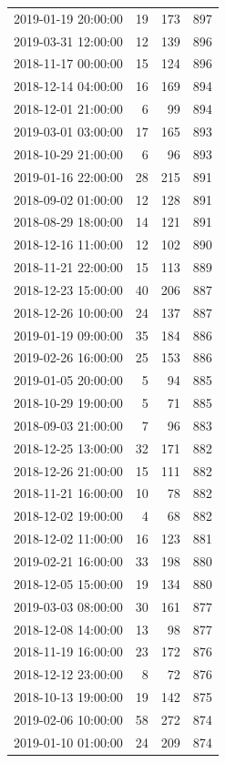 \begin{tabular}{lrrr}
2019-01-19 20:00:00 & 19 & 173 & 897 \\
2019-03-31 12:00:00 & 12 & 139 & 896 \\
2018-11-17 00:00:00 & 15 & 124 & 896 \\
2018-12-14 04:00:00 & 16 & 169 & 894 \\
2018-12-01 21:00:00 & 6 & 99 & 894 \\
2019-03-01 03:00:00 & 17 & 165 & 893 \\
2018-10-29 21:00:00 & 6 & 96 & 893 \\
2019-01-16 22:00:00 & 28 & 215 & 891 \\
2018-09-02 01:00:00 & 12 & 128 & 891 \\
2018-08-29 18:00:00 & 14 & 121 & 891 \\
2018-12-16 11:00:00 & 12 & 102 & 890 \\
2018-11-21 22:00:00 & 15 & 113 & 889 \\
2018-12-23 15:00:00 & 40 & 206 & 887 \\
2018-12-26 10:00:00 & 24 & 137 & 887 \\
2019-01-19 09:00:00 & 35 & 184 & 886 \\
2019-02-26 16:00:00 & 25 & 153 & 886 \\
2019-01-05 20:00:00 & 5 & 94 & 885 \\
2018-10-29 19:00:00 & 5 & 71 & 885 \\
2018-09-03 21:00:00 & 7 & 96 & 883 \\
2018-12-25 13:00:00 & 32 & 171 & 882 \\
2018-12-26 21:00:00 & 15 & 111 & 882 \\
2018-11-21 16:00:00 & 10 & 78 & 882 \\
2018-12-02 19:00:00 & 4 & 68 & 882 \\
2018-12-02 11:00:00 & 16 & 123 & 881 \\
2019-02-21 16:00:00 & 33 & 198 & 880 \\
2018-12-05 15:00:00 & 19 & 134 & 880 \\
2019-03-03 08:00:00 & 30 & 161 & 877 \\
2018-12-08 14:00:00 & 13 & 98 & 877 \\
2018-11-19 16:00:00 & 23 & 172 & 876 \\
2018-12-12 23:00:00 & 8 & 72 & 876 \\
2018-10-13 19:00:00 & 19 & 142 & 875 \\
2019-02-06 10:00:00 & 58 & 272 & 874 \\
2019-01-10 01:00:00 & 24 & 209 & 874 \\

\end{tabular}
